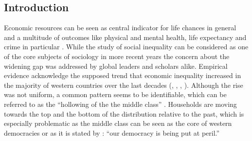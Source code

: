 \documentclass[twoside]{article}\usepackage[]{graphicx}\usepackage[]{color}
\begin{document}
\begin{multicols}{2} %




\section{Introduction}



Economic resources can be seen as central indicator for life chances in general and a multitude of outcomes like physical and mental health, life expectancy and crime in particular \citep{wilkinson_income_2009}. While the study of social inequality can be considered as one of the core subjects of sociology in more recent years the concern about the widening gap was addressed by global leaders \citep{world_economic_forum_global_2013} and scholars alike. Empirical evidence acknowledge the supposed trend that economic inequality increased in the majority of western countries over the last decades (\citealt{oecd_growing_2008}, \citealt{oecd_divided_2011}, \citealt{gornick_income_2013}, \citealt{salverda_changing_2014}). Although the rise was not uniform, a common pattern seems to be identifiable, which can be referred to as the ``hollowing of the the middle class'' \citep{gornick_how_2013}. Households are moving towards the top and the bottom of the distribution relative to the past, which is especially problematic as the middle class can be seen as the core of western democracies or as it is stated by \citet[117]{stiglitz_price_2012}: ``our democracy is being put at peril.''
\\




\end{multicols}
\end{document}
